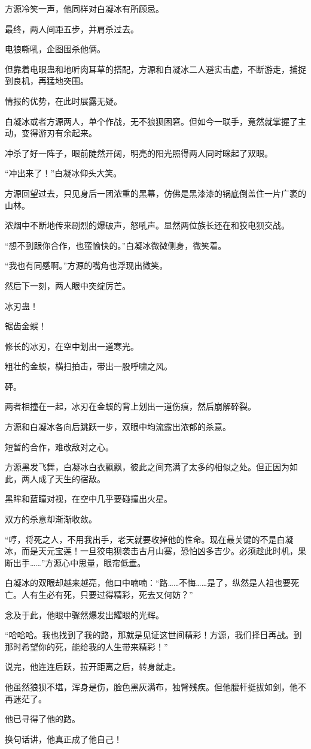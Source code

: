 \begin{this_body}
方源冷笑一声，他同样对白凝冰有所顾忌。

最终，两人间距五步，并肩杀过去。

电狼嘶吼，企图围杀他俩。

但靠着电眼蛊和地听肉耳草的搭配，方源和白凝冰二人避实击虚，不断游走，捕捉到良机，再猛地突围。

情报的优势，在此时展露无疑。

白凝冰或者方源两人，单个作战，无不狼狈困窘。但如今一联手，竟然就掌握了主动，变得游刃有余起来。

冲杀了好一阵子，眼前陡然开阔，明亮的阳光照得两人同时眯起了双眼。

“冲出来了！”白凝冰仰头大笑。

方源回望过去，只见身后一团浓重的黑幕，仿佛是黑漆漆的锅底倒盖住一片广袤的山林。

浓烟中不断地传来剧烈的爆破声，怒吼声。显然两位族长还在和狡电狈交战。

“想不到跟你合作，也蛮愉快的。”白凝冰微微侧身，微笑着。

“我也有同感啊。”方源的嘴角也浮现出微笑。

然后下一刻，两人眼中突绽厉芒。

冰刃蛊！

锯齿金蜈！

修长的冰刃，在空中划出一道寒光。

粗壮的金蜈，横扫拍击，带出一股呼啸之风。

砰。

两者相撞在一起，冰刃在金蜈的背上划出一道伤痕，然后崩解碎裂。

方源和白凝冰各向后跳跃一步，双眼中均流露出浓郁的杀意。

短暂的合作，难改敌对之心。

方源黑发飞舞，白凝冰白衣飘飘，彼此之间充满了太多的相似之处。但正因为如此，两人成了天生的宿敌。

黑眸和蓝瞳对视，在空中几乎要碰撞出火星。

双方的杀意却渐渐收敛。

“哼，将死之人，不用我出手，老天就要收掉他的性命。现在最关键的不是白凝冰，而是天元宝莲！一旦狡电狈袭击古月山寨，恐怕凶多吉少。必须趁此时机，果断出手……”方源心中思量，眼帘低垂。

白凝冰的双眼却越来越亮，他口中喃喃：“路……不悔……是了，纵然是人祖也要死亡。人有生必有死，只要过得精彩，死去又何妨？”

念及于此，他眼中骤然爆发出耀眼的光辉。

“哈哈哈。我也找到了我的路，那就是见证这世间精彩！方源，我们择日再战。到那时希望你的死，能给我的人生带来精彩！”

说完，他连连后跃，拉开距离之后，转身就走。

他虽然狼狈不堪，浑身是伤，脸色黑灰满布，独臂残疾。但他腰杆挺拔如剑，他不再迷茫了。

他已寻得了他的路。

换句话讲，他真正成了他自己！

\end{this_body}

